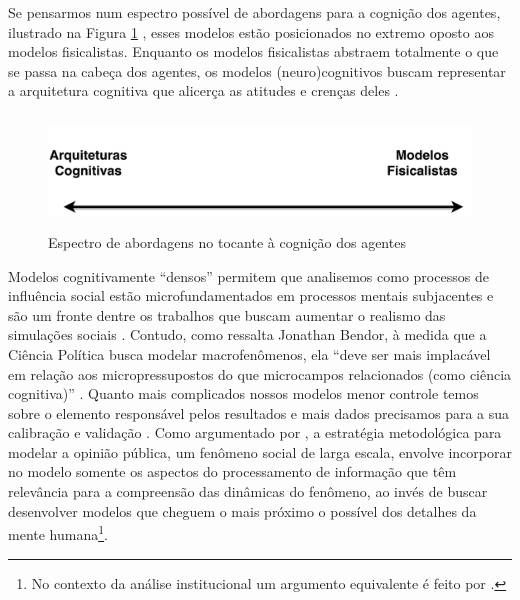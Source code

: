 Se pensarmos num espectro possível de abordagens para a cognição dos agentes,
ilustrado na Figura \ref{fig4} , esses modelos estão posicionados no extremo
oposto aos modelos fisicalistas. Enquanto os modelos fisicalistas abstraem
totalmente o que se passa na cabeça dos agentes, os modelos (neuro)cognitivos
buscam representar a arquitetura cognitiva que alicerça as atitudes e crenças
deles \cite{kim2010computational}.

\begin{figure}[H]
  \centering
  \caption{Espectro de abordagens no tocante à cognição dos agentes}
  \includegraphics[width = \textwidth, height = 3cm]{ims/line.pdf}
  
  \label{fig4}
\end{figure}

Modelos cognitivamente ``densos'' permitem que analisemos como processos de
influência social estão microfundamentados em processos mentais subjacentes e
são um fronte dentre os trabalhos que buscam aumentar o realismo das simulações
sociais \cite{jager2017,epstein2014agent_zero, conte2013minding}. Contudo, como
ressalta Jonathan Bendor, à medida que a Ciência Política busca modelar
macrofenômenos, ela ``deve ser mais implacável em relação aos micropressupostos
do que microcampos relacionados (como ciência cognitiva)''
\cite[p.45]{bendor2010bounded}. Quanto mais complicados nossos modelos menor
controle temos sobre o elemento responsável pelos resultados e mais dados
precisamos para a sua calibração e validação \cite{de2005computational,
  bendor2010bounded}. Como argumentado por , a
estratégia metodológica para modelar a opinião pública, um fenômeno social de
larga escala, envolve incorporar no modelo somente os aspectos do processamento
de informação que têm relevância para a compreensão das dinâmicas do fenômeno,
ao invés de buscar desenvolver modelos que cheguem o mais próximo o possível dos
detalhes da mente humana\footnote{No contexto da análise institucional um
  argumento equivalente é feito por .}.


